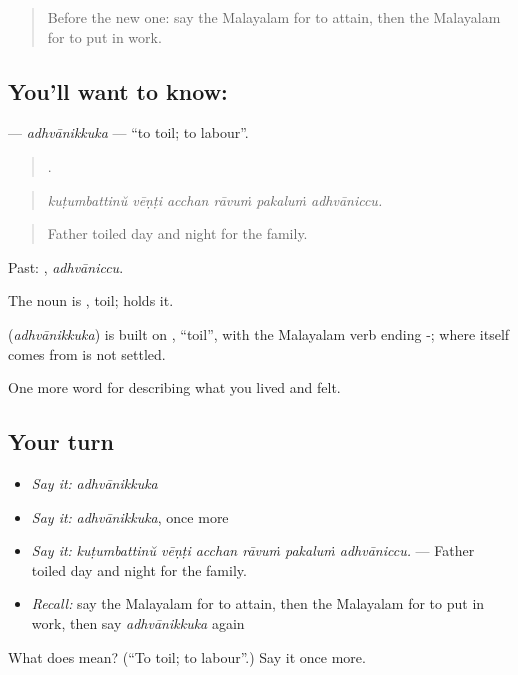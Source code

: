 \begin{quote}
Before the new one: say the Malayalam for to attain, then the Malayalam for to put in work.
\end{quote}

\subsection*{You'll want to know: }
\textbf{} — \emph{adhvānikkuka} — \textquotedblleft{}to toil; to labour\textquotedblright{}.

\begin{quote}
     .
\end{quote}

\begin{quote}
\emph{kuṭumbattinŭ vēṇṭi acchan rāvuṁ pakaluṁ adhvāniccu.}
\end{quote}

\begin{quote}
Father toiled day and night for the family.
\end{quote}

Past: , \emph{adhvāniccu}.

The noun is , toil;  holds it.

\begin{cousinweb}
\textbf{} (\emph{adhvānikkuka}) is built on , \textquotedblleft{}toil\textquotedblright{}, with the Malayalam verb ending -; where  itself comes from is not settled.
\end{cousinweb}

\begin{grammarlens}[title={What you've built}]
One more word for describing what you lived and felt.
\end{grammarlens}

\subsection*{Your turn}
\begin{itemize}
\raggedright
  \item \emph{Say it:} \emph{adhvānikkuka}
  \item \emph{Say it:} \emph{adhvānikkuka}, once more
  \item \emph{Say it:} \emph{kuṭumbattinŭ vēṇṭi acchan rāvuṁ pakaluṁ adhvāniccu.} — Father toiled day and night for the family.
  \item \emph{Recall:} say the Malayalam for to attain, then the Malayalam for to put in work, then say \emph{adhvānikkuka} again
\end{itemize}

\begin{tcolorbox}[breakable,colback=teal!4,colframe=teal!35!black,title={Before you move on}]
What does  mean? (\textquotedblleft{}To toil; to labour\textquotedblright{}.) Say it once more.
\end{tcolorbox}

